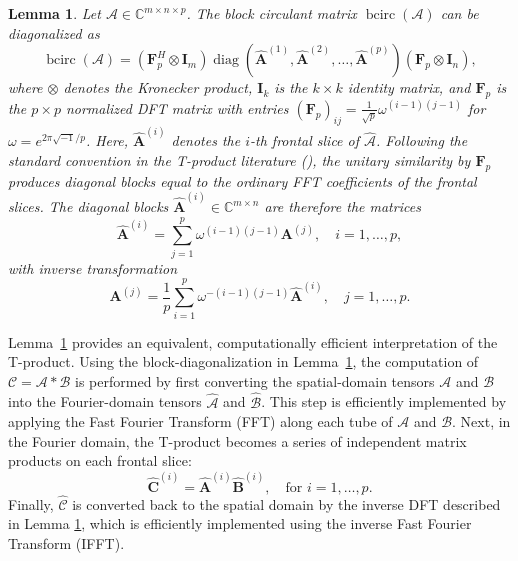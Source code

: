 \documentclass[pdflatex,sn-mathphys-ay]{sn-jnl}
\newcommand{\T}[1]{\mathcal{#1}}    %
\newcommand{\M}[1]{\bm{#1}}     %
\newcommand{\C}{\mathbb{C}}         %
\newcommand{\bcirc}{\operatorname{bcirc}}
\newcommand{\diag}{\operatorname{diag}}
\theoremstyle{thmstyleone}
\newtheorem{lemma}[theorem]{Lemma}
\theoremstyle{thmstyletwo}
\theoremstyle{thmstylethree}
\numberwithin{equation}{section}
\begin{document}
\begin{lemma}
\label{LemmaFourierBlockDiag}
Let $\T{A} \in \C^{m \times n \times p}$. 
The block circulant matrix $\bcirc(\T{A})$ can be diagonalized as
\begin{equation}\label{eqFourierBlockDiagMN}
    \bcirc(\T{A})=(\M{F}_{p}^H \otimes \M{I}_{m}) \diag(\widehat{\M{A}}^{(1)},\widehat{\M{A}}^{(2)},\ldots,\widehat{\M{A}}^{(p)}) (\M{F}_{p} \otimes \M{I}_{n}),
\end{equation}
where $\otimes$ denotes the Kronecker product, $\M{I}_{k}$ is the $k\times k$ identity matrix, and $\M{F}_{p}$ is the $p\times p$ normalized DFT matrix with entries $(\M{F}_{p})_{ij} = \frac{1}{\sqrt{p}}\omega^{(i-1)(j-1)}$ for $\omega=e^{2 \pi \sqrt{-1}/p}$. Here, 
$\widehat{\M{A}}^{(i)}$ denotes the $i$-th frontal slice of $\widehat{\T{A}}$. Following the standard convention in the T-product literature (\cite{kilmer2011factorization,kilmer2013third}), the unitary similarity by $\M{F}_{p}$ produces diagonal blocks equal to the ordinary FFT coefficients of the frontal slices. The diagonal blocks $\widehat{\M{A}}^{(i)} \in \C^{m \times n}$ are therefore the matrices
\begin{equation*}
\widehat{\M{A}}^{(i)} = \sum_{j=1}^{p} \omega^{(i-1)(j-1)}\M{A}^{(j)}, \quad i=1,\dots,p,
\end{equation*}
with inverse transformation
\begin{equation} \label{eq:ifft}
\M{A}^{(j)} = \frac{1}{p}\sum_{i=1}^{p} \omega^{-(i-1)(j-1)}\widehat{\M{A}}^{(i)}, \quad j=1,\dots,p.
\end{equation}
\end{lemma}

Lemma~\ref{LemmaFourierBlockDiag} provides an equivalent, computationally efficient interpretation of the T-product. Using the block-diagonalization in Lemma~\ref{LemmaFourierBlockDiag}, the computation of $\T{C} = \T{A} * \T{B}$ is performed by first converting the spatial-domain tensors $\T{A}$ and $\T{B}$ into the Fourier-domain tensors $\widehat{\T{A}}$ and $\widehat{\T{B}}$. This step is efficiently implemented by applying the Fast Fourier Transform (FFT) along each tube of $\T{A}$ and $\T{B}$. Next, in the Fourier domain, the T-product becomes a series of independent matrix products on each frontal slice:
\begin{equation*}
\widehat{\M{C}}^{(i)} = \widehat{\M{A}}^{(i)}\widehat{\M{B}}^{(i)}, \quad \text{for } i=1, \dots, p.
\end{equation*}
Finally, $\widehat{\T{C}}$ is converted back to the spatial domain by the inverse DFT described in Lemma \ref{LemmaFourierBlockDiag},
which is efficiently implemented using the inverse Fast Fourier Transform (IFFT).
\end{document}
